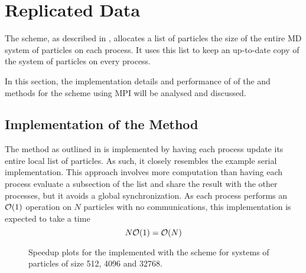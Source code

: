 \section{Replicated Data}

The \replicateddata{} scheme, as described in
,
allocates a list of particles the size of
the entire MD system of particles
on each process.
%
It uses this list to keep an up-to-date copy of the system of particles
on every process.

In this section, the implementation details and performance of
of the \individualoperation{} and \pairoperation{} methods
for the \replicateddata{} scheme using MPI will be analysed and discussed.


%
%

\subsection{Implementation of the \individualoperation{} Method}

The \individualoperation{} method as outlined in
is implemented by having each process update
its entire local list of particles.
%
As such, it closely resembles the example serial implementation.
%
This approach involves more computation than having each process
evaluate a subsection of the list and share the result with the
other processes, but it avoids a global synchronization.
%
As each process performs an $\mathcal{O}{\left({ 1 }\right)}$ operation on $N$ particles with
no communications,
this implementation is expected to take a time
\begin{equation}
\label{eqn:v0_replicated_individual_operation_overall_time}
    N\mathcal{O}{\left({ 1 }\right)} = \mathcal{O}{\left({ N }\right)}
\end  {equation}


%
%
\begin{figure}[!h]
    
    \caption{
        Speedup plots for the \individualoperation{} implemented with the \replicateddata{} scheme for systems of particles of size 512, 4096 and 32768.
    }
    \label{fig:v0_replicated_data_individual_operation_speedups}
\end{figure}


%
%
\begin{figure}[!h]
    
    \caption{}
    \label{fig:v0_replicated_individual_operation_512_time}
\end  {figure}

